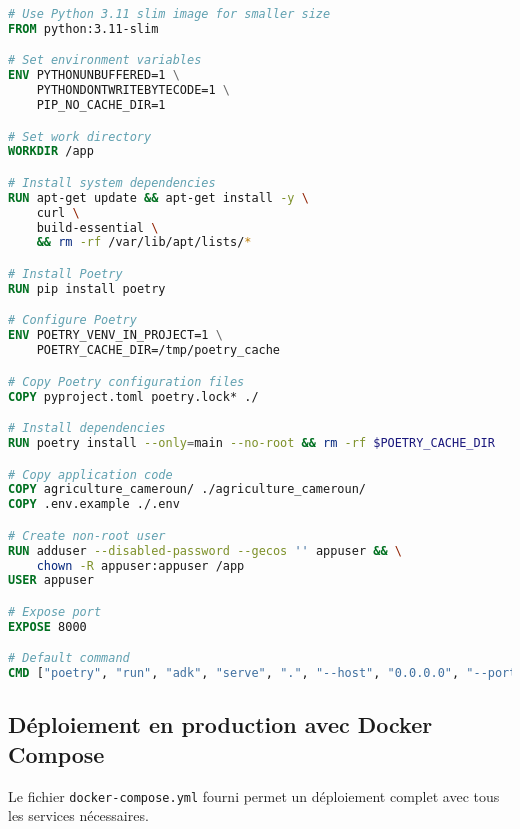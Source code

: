 \begin{lstlisting}[language=Dockerfile, caption=Dockerfile du projet]
# Use Python 3.11 slim image for smaller size
FROM python:3.11-slim

# Set environment variables
ENV PYTHONUNBUFFERED=1 \
    PYTHONDONTWRITEBYTECODE=1 \
    PIP_NO_CACHE_DIR=1

# Set work directory
WORKDIR /app

# Install system dependencies
RUN apt-get update && apt-get install -y \
    curl \
    build-essential \
    && rm -rf /var/lib/apt/lists/*

# Install Poetry
RUN pip install poetry

# Configure Poetry
ENV POETRY_VENV_IN_PROJECT=1 \
    POETRY_CACHE_DIR=/tmp/poetry_cache

# Copy Poetry configuration files
COPY pyproject.toml poetry.lock* ./

# Install dependencies
RUN poetry install --only=main --no-root && rm -rf $POETRY_CACHE_DIR

# Copy application code
COPY agriculture_cameroun/ ./agriculture_cameroun/
COPY .env.example ./.env

# Create non-root user
RUN adduser --disabled-password --gecos '' appuser && \
    chown -R appuser:appuser /app
USER appuser

# Expose port
EXPOSE 8000

# Default command
CMD ["poetry", "run", "adk", "serve", ".", "--host", "0.0.0.0", "--port", "8000"]
\end{lstlisting}

\subsection{Déploiement en production avec Docker Compose}

Le fichier \texttt{docker-compose.yml} fourni permet un déploiement complet avec tous les services nécessaires.

